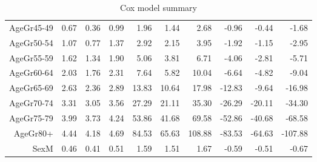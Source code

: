 \begin{table}[ht]
\begin{tabular}{rrrrrrrrrr}
  AgeGr45-49 & 0.67 & 0.36 & 0.99 & 1.96 & 1.44 & 2.68 & -0.96 & -0.44 & -1.68 \\ 
  AgeGr50-54 & 1.07 & 0.77 & 1.37 & 2.92 & 2.15 & 3.95 & -1.92 & -1.15 & -2.95 \\ 
  AgeGr55-59 & 1.62 & 1.34 & 1.90 & 5.06 & 3.81 & 6.71 & -4.06 & -2.81 & -5.71 \\ 
  AgeGr60-64 & 2.03 & 1.76 & 2.31 & 7.64 & 5.82 & 10.04 & -6.64 & -4.82 & -9.04 \\ 
  AgeGr65-69 & 2.63 & 2.36 & 2.89 & 13.83 & 10.64 & 17.98 & -12.83 & -9.64 & -16.98 \\ 
  AgeGr70-74 & 3.31 & 3.05 & 3.56 & 27.29 & 21.11 & 35.30 & -26.29 & -20.11 & -34.30 \\ 
  AgeGr75-79 & 3.99 & 3.73 & 4.24 & 53.86 & 41.68 & 69.58 & -52.86 & -40.68 & -68.58 \\ 
  AgeGr80+ & 4.44 & 4.18 & 4.69 & 84.53 & 65.63 & 108.88 & -83.53 & -64.63 & -107.88 \\ 
  SexM & 0.46 & 0.41 & 0.51 & 1.59 & 1.51 & 1.67 & -0.59 & -0.51 & -0.67 \\ 
   \hline
\end{tabular}
\caption{Cox model summary} 
\end{table}
